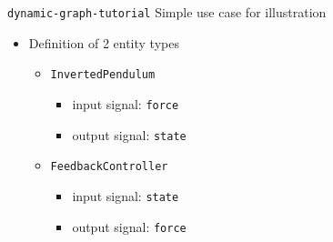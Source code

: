 %
%
\begin {frame} {\texttt{dynamic-graph-tutorial}}
  Simple use case for illustration
  \begin{itemize}
  \item Definition of 2 entity types
    \begin{itemize}
    \item \texttt{InvertedPendulum}
      \begin{itemize}
      \item input signal: \texttt{force}
      \item output signal: \texttt{state}
      \end{itemize}
    \item \texttt{FeedbackController}
      \begin{itemize}
      \item input signal: \texttt{state}
      \item output signal: \texttt{force}
      \end{itemize}
    \end{itemize}
  \end{itemize}
\end{frame}

